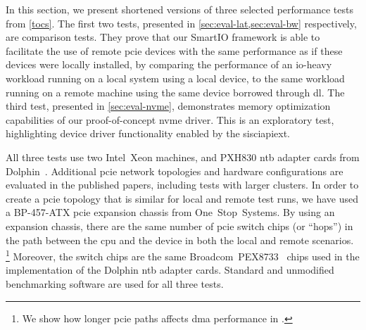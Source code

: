 In this section, we present shortened versions of three selected performance tests from \cref{tocs}.
%
The first two tests, presented in \cref{sec:eval-lat,sec:eval-bw} respectively, are comparison tests.
%
They prove that our SmartIO framework is able to facilitate the use of remote \gls{pcie} devices with the same performance as if these devices were locally installed, by comparing the performance of an \gls{io}-heavy workload running on a local system using a local device, to the same workload running on a remote machine using the same device borrowed through \gls{dl}.
%
The third test, presented in \cref{sec:eval-nvme}, demonstrates memory optimization capabilities of our proof-of-concept \gls{nvme} driver.
%
This is an exploratory test, highlighting device driver functionality enabled by the \gls{sisciapiext}.



All three tests use two Intel~Xeon machines, and PXH830 \gls{ntb} adapter cards from Dolphin~\cite{pxh830}.
%
Additional \gls{pcie} network topologies and hardware configurations are evaluated in the published papers, including tests with larger clusters.
%
In order to create a \gls{pcie} topology that is similar for local and remote test runs, we have used a BP-457-ATX \gls{pcie} expansion chassis from One~Stop~Systems.
%
By using an expansion chassis, there are the same number of \gls{pcie} switch chips (or ``hops'') in the path between the \gls{cpu} and the device in both the local and remote scenarios.%
\footnote{We show how longer \gls{pcie} paths affects \gls{dma} performance in .}
%
Moreover, the switch chips are the same  Broadcom~PEX8733~\cite{pex8733} chips used in the implementation of the Dolphin \gls{ntb} adapter cards.
%
Standard and unmodified benchmarking software are used for all three tests.


